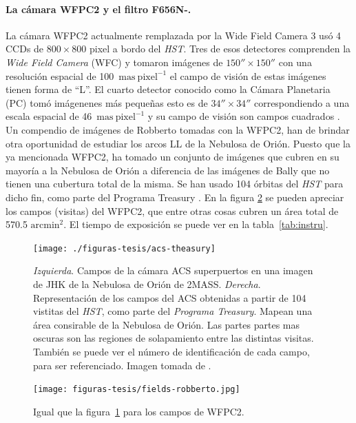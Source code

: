 \paragraph{La cámara WFPC2 y el filtro F656N-\ha{}.}
La cámara WFPC2 actualmente remplazada por la Wide Field Camera 3 usó 4 CCDs de $800\times800$ pixel a bordo del \textit{HST}. Tres de esos detectores comprenden la \textit{Wide Field Camera} (WFC) y tomaron imágenes de \(150''\times150''\) con una resolución espacial de 100~\(\mathrm{mas~pixel^{-1}}\) el campo de visión de estas imágenes tienen forma de ``L''. El cuarto detector conocido como la  Cámara Planetaria (PC) tomó imágenenes más pequeñas esto es de \(34''\times34''\) correspondiendo a una escala espacial de 46~\(\mathrm{mas~pixel^{-1}}\) y su campo de visión son campos cuadrados \citep{McMaster:2008}. Un compendio de imágenes de Robberto tomadas con la WFPC2, han de brindar otra oportunidad de estudiar los arcos LL de la Nebulosa de Orión. Puesto que la ya mencionada WFPC2, ha tomado un conjunto de imágenes que cubren en su mayoría a la Nebulosa de Orión a diferencia de las imágenes de Bally que no tienen una cubertura total de la misma. Se han usado 104 órbitas del \textit{HST} para dicho fin, como parte del Programa Treasury \citep{Robberto:2013a}. En la figura \ref{fig:fields-robberto} se pueden apreciar los campos (visitas) del WFPC2, que entre otras cosas cubren un área total de 570.5 \(\text{arcmin}^{2}\). El tiempo de exposición se puede ver en la tabla~\ref{tab:instru}. \\

\begin{figure}
\centering
  \texttt{[image: ./figuras-tesis/acs-theasury]}
\caption{\textit{Izquierda}. Campos de la cámara ACS superpuertos en una imagen de JHK de la Nebulosa de Orión de 2MASS. \textit{Derecha}. Representación de los campos del ACS obtenidas a partir de 104 vistitas del \textit{HST}, como parte del \textit{Programa Treasury}. Mapean una área consirable de la Nebulosa de Orión. Las partes partes mas oscuras son las regiones de solapamiento entre las distintas visitas. También se puede ver el número de identificación de cada campo, para ser referenciado. Imagen tomada de \citet{Robberto:2013a}. }\label{fig:field-acs-the}
\end{figure}

\begin{figure}
  \centering
  \texttt{[image: figuras-tesis/fields-robberto.jpg]}
  \caption{Igual que la figura~\ref{fig:field-acs-the} para los campos de WFPC2.}
  \label{fig:fields-robberto}
\end{figure}

